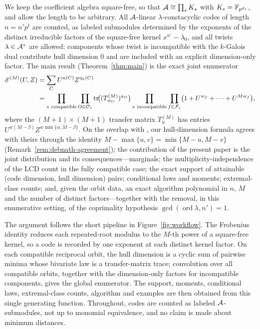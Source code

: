 We keep the coefficient algebra square-free, so that
$\mathcal A\cong\prod_s K_s$ with $K_s=\mathbb F_{p^{d_s}}$, and allow the length to be
arbitrary. All $\mathcal A$-linear $\lambda$-constacyclic codes of length $n=n'p^t$
are counted, as labeled submodules determined by the exponents of the
distinct irreducible factors of the square-free kernel $x^{n'}-\lambda_0$, and
all twists $\lambda\in\mathcal A^\ast$ are allowed: components whose twist is
incompatible with the $k$-Galois dual contribute hull dimension $0$ and are
included with an explicit dimension-only factor. The main result
(Theorem~\ref{thm:main}) is the exact joint enumerator
\begin{align*}
  \mathscr E^{(M)}(U,Z)
  &=\sum_{C} U^{\kappa(C)} Z^{\eta_k(C)}\\
  &=\prod_{s\ \mathrm{compatible}}\prod_{O\in\mathcal O_s}
     \operatorname{tr}\!\bigl((T^{(M)}_{w_O})^{a_O}\bigr)
   \prod_{s\ \mathrm{incompatible}}\prod_{f\in\mathcal F_s}
     \bigl(1+U^{w_f}+\cdots+U^{Mw_f}\bigr),
\end{align*}
where the $(M+1)\times(M+1)$ transfer matrix $T^{(M)}_w$ has entries
$U^{w(M-\beta)}Z^{w\min\{\alpha,M-\beta\}}$. On the overlap with
\cite{debnathAffine2026}, our hull-dimension formula agrees with theirs
through the identity $M-\max\{u,v\}=\min\{M-u,M-v\}$
(Remark~\ref{rem:debnath-agreement}); the contribution of the present paper
is the joint distribution and its consequences---marginals; the
multiplicity-independence of the LCD count in the fully compatible case;
the exact support of attainable (code dimension, hull dimension) pairs;
conditional laws and moments; extremal-class counts; and, given the orbit
data, an exact algorithm polynomial in $n$, $M$ and the number of distinct
factors---together
with the removal, in this enumerative setting, of the coprimality hypothesis
$\gcd(\operatorname{ord}\lambda,n')=1$.


The argument follows the short pipeline in Figure~\ref{fig:workflow}. The Frobenius identity reduces each
repeated-root modulus to the $M$-th power of a square-free kernel, so a code
is recorded by one exponent at each distinct kernel factor. On each
compatible reciprocal orbit, the hull dimension is a cyclic sum of pairwise
minima whose bivariate law is a transfer-matrix trace; convolution over all
compatible orbits, together with the dimension-only factors for incompatible
components, gives the global enumerator. The support, moments, conditional
laws, extremal-class counts, algorithm and examples are then obtained from
this single generating function. Throughout, codes are counted as labeled
$\mathcal A$-submodules, not up to monomial equivalence, and no claim is made about
minimum distances.

